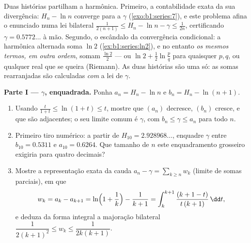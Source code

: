 \begin{problem}[{Problema de fim de semana --- $H_n = \ln n + \gamma +
\frac{1}{2n} + O(n^{-2})$, e rearranjar $1 - \frac12 +
\frac13 - \dots$ para $\frac{\ln 2}{2}$}]
\label{pb:b1:series:1}
Duas histórias partilham a  harmônica. Primeiro, a
contabilidade exata da sua divergência: $H_n - \ln n$ converge para a
 $\gamma$ (\cref{exo:b1:series:7}), e este problema
afina o enunciado numa lei bilateral $\frac{1}{2(n+1)}
\leq H_n - \ln n - \gamma \leq \frac{1}{2n}$, certificando $\gamma
= 0.5772\dots$ à mão.
Segundo, o escândalo da convergência condicional: a  harmônica
alternada soma $\ln 2$ (\cref{ex:b1:series:ln2}), e no entanto \emph{os mesmos termos,
em outra ordem}, somam $\frac{\ln 2}{2}$ --- ou $\ln 2 +
\frac12\ln\frac pq$ para quaisquer $p, q$, ou
qualquer real que se queira (Riemann). As duas histórias são uma
só: as somas rearranjadas são calculadas \emph{com} a lei de
$\gamma$.

\medskip
\noindent\textbf{Parte I --- $\gamma$, enquadrada.} Ponha $a_n = H_n
- \ln n$ e
$b_n = H_n - \ln(n+1)$.
\begin{enumerate}
  \item Usando $\frac{t}{1+t} \leq \ln(1 + t) \leq t$, mostre que
        $(a_n)$ decresce, $(b_n)$ cresce, e que são adjacentes; o
        seu limite comum é $\gamma$, com $b_n \leq
        \gamma \leq a_n$ para todo $n$.
  \item Primeiro tiro numérico: a partir de $H_{10} = 2.928968\dots$,
        enquadre $\gamma$ entre $b_{10} = 0.5311$ e $a_{10} =
        0.6264$. Que tamanho de $n$
        este enquadramento grosseiro exigiria para quatro decimais?
  \item Mostre a representação exata da cauda $a_n - \gamma =
        \sum_{k \geq n} w_k$ (limite de somas
        parciais), em que
        \[
        w_k = a_k - a_{k+1}
        = \ln\Bigl(1 + \frac1k\Bigr) - \frac{1}{k+1}
        = \int_k^{k+1} \frac{(k + 1 - t)}{t\,(k+1)}\,\dd t ,
        \]
        e deduza da forma integral a majoração bilateral
        $\dfrac{1}{2(k+1)^2} \leq w_k \leq \dfrac{1}{2k(k+1)}$.
\end{enumerate}


\end{problem}
